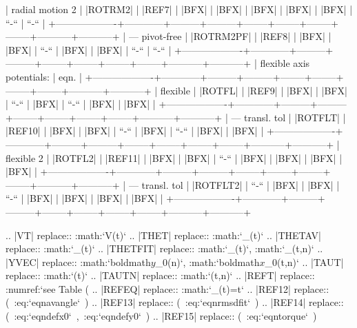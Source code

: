            | radial motion 2   | |ROTRM2|   | |REF7|  | |BFX|   | |BFX|  | |BFX|  | |BFX|  | |BFX|  | ``-``     | ``-``     |
           +-------------------+------------+---------+---------+--------+--------+--------+--------+-----------+-----------+
           | --- pivot-free    | |ROTRM2PF| | |REF8|  | |BFX|   | |BFX|  | ``-``  | |BFX|  | |BFX|  | ``-``     | ``-``     |
           +-------------------+------------+---------+---------+--------+--------+--------+--------+-----------+-----------+
           | flexible axis potentials:      | eqn.                                                                          | 
           +-------------------+------------+---------+---------+--------+--------+--------+--------+-----------+-----------+
           | flexible          | |ROTFL|    | |REF9|  | |BFX|   | |BFX|  | ``-``  | |BFX|  | ``-``  | |BFX|     | |BFX|     |
           +-------------------+------------+---------+---------+--------+--------+--------+--------+-----------+-----------+
           | --- transl. tol   | |ROTFLT|   | |REF10| | |BFX|   | |BFX|  | ``-``  | |BFX|  | ``-``  | |BFX|     | |BFX|     |
           +-------------------+------------+---------+---------+--------+--------+--------+--------+-----------+-----------+
           | flexible 2        | |ROTFL2|   | |REF11| | |BFX|   | |BFX|  | ``-``  | |BFX|  | |BFX|  | |BFX|     | |BFX|     |
           +-------------------+------------+---------+---------+--------+--------+--------+--------+-----------+-----------+
           | --- transl. tol   | |ROTFLT2|  | ``-``   | |BFX|   | |BFX|  | ``-``  | |BFX|  | |BFX|  | |BFX|     | |BFX|     |
           +-------------------+------------+---------+---------+--------+--------+--------+--------+-----------+-----------+


.. |VT|      replace:: :math:`V(t)`
.. |THET|    replace:: :math:`\theta_(t)`
.. |THETAV|  replace:: :math:`\theta_(t)`
.. |THETFIT| replace:: :math:`\theta_(t)`, :math:`\theta_(t,n)`
.. |YVEC|    replace:: :math:`{\mbox{boldmath{$y$}}}_{0}(n)`, :math:`{\mbox{boldmath{$x$}}}_{0}(t,n)`
.. |TAUT|    replace:: :math:`\tau(t)`
.. |TAUTN|   replace:: :math:`\tau(t,n)`
.. |REFT|  replace:: :numref:`see Table (%
.. |REFEQ| replace:: :math:`\theta_(t)=\omega t`
.. |REF12| replace:: (\ :eq:`eqnavangle`\ )               
.. |REF13| replace:: (\ :eq:`eqnrmsdfit`\ )               
.. |REF14| replace:: (\ :eq:`eqndefx0`\ ,\ :eq:`eqndefy0`\ )
.. |REF15| replace:: (\ :eq:`eqntorque`\ )                

